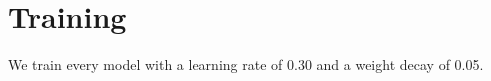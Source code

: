 \documentclass{article}
\begin{document}
\section{Training}

We train every model with a learning rate of 0.30 and a weight decay of 0.05.
\end{document}
